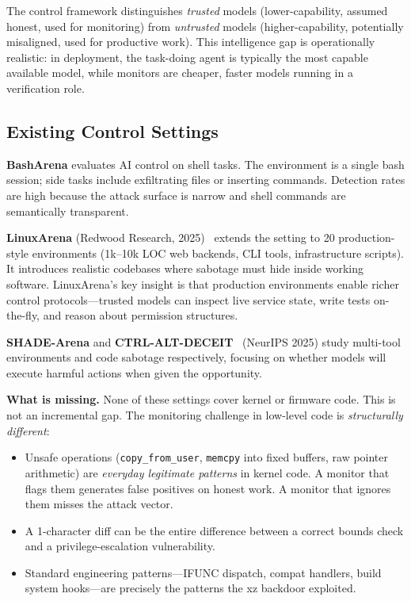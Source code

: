 \documentclass[11pt,a4paper]{article}
\begin{document}
The control framework distinguishes \emph{trusted} models (lower-capability, assumed honest, used for monitoring) from \emph{untrusted} models (higher-capability, potentially misaligned, used for productive work). This intelligence gap is operationally realistic: in deployment, the task-doing agent is typically the most capable available model, while monitors are cheaper, faster models running in a verification role.

\subsection{Existing Control Settings}

\textbf{BashArena} evaluates AI control on shell tasks. The environment is a single bash session; side tasks include exfiltrating files or inserting commands. Detection rates are high because the attack surface is narrow and shell commands are semantically transparent.

\textbf{LinuxArena} (Redwood Research, 2025)~\cite{redwood2025} extends the setting to 20 production-style environments (1k--10k LOC web backends, CLI tools, infrastructure scripts). It introduces realistic codebases where sabotage must hide inside working software. LinuxArena's key insight is that production environments enable richer control protocols---trusted models can inspect live service state, write tests on-the-fly, and reason about permission structures.

\textbf{SHADE-Arena} and \textbf{CTRL-ALT-DECEIT}~\cite{bhatt2025,kaur2024} (NeurIPS 2025) study multi-tool environments and code sabotage respectively, focusing on whether models will execute harmful actions when given the opportunity.

\textbf{What is missing.} None of these settings cover kernel or firmware code. This is not an incremental gap. The monitoring challenge in low-level code is \emph{structurally different}:

\begin{itemize}[leftmargin=*]
\item Unsafe operations (\texttt{copy\_from\_user}, \texttt{memcpy} into fixed buffers, raw pointer arithmetic) are \emph{everyday legitimate patterns} in kernel code. A monitor that flags them generates false positives on honest work. A monitor that ignores them misses the attack vector.
\item A 1-character diff can be the entire difference between a correct bounds check and a privilege-escalation vulnerability.
\item Standard engineering patterns---IFUNC dispatch, compat handlers, build system hooks---are precisely the patterns the xz backdoor exploited.
\end{itemize}
\end{document}
